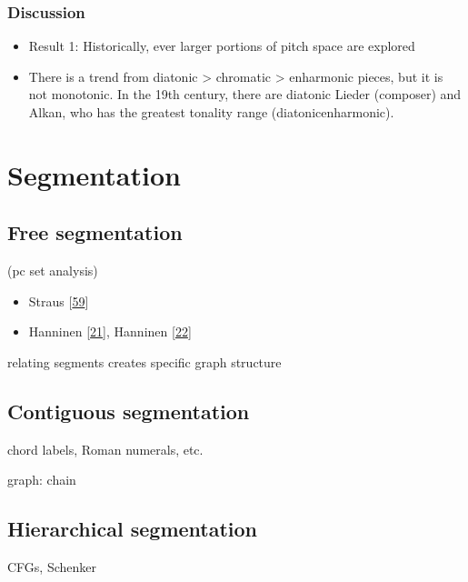 \documentclass[letterpaper,10pt,english]{sphinxmanual}
\begin{document}
\subsection{Discussion}
\label{\detokenize{topic_modeling:discussion}}\begin{itemize}
\item {} 
\sphinxAtStartPar
Result 1: Historically, ever larger portions of pitch space are explored

\item {} 
\sphinxAtStartPar
There is a trend from diatonic \textgreater{} chromatic \textgreater{} enharmonic pieces, but it
is not monotonic. In the 19th century, there are diatonic Lieder
(composer) and Alkan, who has the greatest tonality range
(diatonic\sphinxhyphen{}enharmonic).

\end{itemize}


\chapter{Segmentation}
\label{\detokenize{5_segmentation:segmentation}}\label{\detokenize{5_segmentation::doc}}

\section{Free segmentation}
\label{\detokenize{5_segmentation:free-segmentation}}
\sphinxAtStartPar
(pc set analysis)
\begin{itemize}
\item {} 
\sphinxAtStartPar
Straus {[}\hyperlink{cite.8_bibliography:id3}{59}{]}

\item {} 
\sphinxAtStartPar
Hanninen {[}\hyperlink{cite.8_bibliography:id54}{21}{]}, Hanninen {[}\hyperlink{cite.8_bibliography:id55}{22}{]}

\end{itemize}

\sphinxAtStartPar
relating segments creates specific graph structure


\section{Contiguous segmentation}
\label{\detokenize{5_segmentation:contiguous-segmentation}}
\sphinxAtStartPar
chord labels, Roman numerals, etc.

\sphinxAtStartPar
graph: chain


\section{Hierarchical segmentation}
\label{\detokenize{5_segmentation:hierarchical-segmentation}}
\sphinxAtStartPar
CFGs, Schenker
\end{document}
